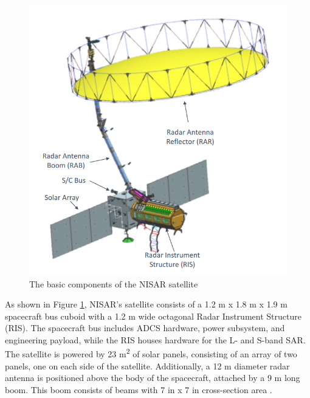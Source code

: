 \begin{figure}[H]
\centering
\includegraphics[scale=0.5]{Images/nisar_diagram.jpg}
\caption{The basic components of the NISAR satellite}
\label{NISAR Diagram}
\end{figure}

As shown in Figure \ref{NISAR Diagram}, NISAR's satellite consists of a 1.2 m x 1.8 m x 1.9 m spacecraft bus cuboid with a 1.2 m wide octagonal Radar Instrument Structure (RIS). The spacecraft bus includes ADCS hardware, power subsystem, and engineering payload, while the RIS houses hardware for the L- and S-band SAR. The satellite is powered by 23 m\textsuperscript{2} of solar panels, consisting of an array of two panels, one on each side of the satellite. Additionally, a 12 m diameter radar antenna is positioned above the body of the spacecraft, attached by a 9 m long boom. This boom consists of beams with 7 in x 7 in cross-section area \cite{NISARMission}.

